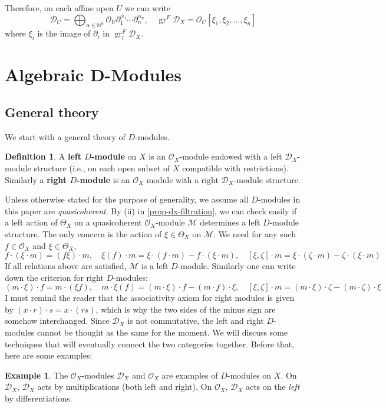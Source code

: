\documentclass[11pt, a4paper]{article}
\theoremstyle{definition}
\newtheorem{example}[theorem]{Example}
\newtheorem{definition}[theorem]{Definition}
\newcommand{\gr}{\operatorname{gr}}
\newcommand{\N}[0]{\mathbb{N}}
\begin{document}
    Therefore, on each affine open $U$ we can write
    \[\mathcal D_U=\bigoplus_{\alpha\in\N^n}\mathcal O_U\partial_1^{\alpha_1}\cdots\partial_n^{\alpha_n}, \quad \gr^F \mathcal D_X=\mathcal O_U[\xi_1,\xi_2,\dots,\xi_n]\]
    where $\xi_i$ is the image of $\partial_i$ in $\gr^F_l\mathcal D_X$.
    \section{Algebraic D-Modules}
    \subsection{General theory}
    We start with a general theory of $D$-modules.
    \begin{definition}
        A \textbf{left $D$-module} on $X$ is an $\mathcal O_X$-module endowed with a left $\mathcal D_X$-module structure (i.e., on each open subset of $X$ compatible with restrictions). Similarly a \textbf{right $D$-module} is an $\mathcal O_X$ module with a right $\mathcal D_X$-module structure.
    \end{definition}
    Unless otherwise stated for the purpose of generality, we assume all $D$-modules in this paper are \textit{quasicoherent}. By (ii) in \cref{prop-dx-filtration}, we can check easily if a left action of $\Theta_X$ on a quasicoherent $\mathcal O_X$-module $\mathcal M$ determines a left $D$-module structure. The only concern is the action of $\xi\in\Theta_X$ on $\mathcal M$. We need for any such $f\in\mathcal O_X$ and $\xi\in\Theta_X$,
    \[f\cdot(\xi\cdot m)=(f\xi)\cdot m,\quad \xi(f)\cdot m=\xi\cdot(f\cdot m)-f\cdot (\xi\cdot m),\quad [\xi,\zeta]\cdot m=\xi\cdot(\zeta\cdot m)-\zeta\cdot(\xi\cdot m)\]
    If all relations above are satisfied, $\mathcal M$ is a left $D$-module. Similarly one can write down the criterion for right $D$-modules:
    \[(m\cdot \xi)\cdot f=m\cdot(\xi f),\quad m\cdot\xi(f)=(m\cdot\xi)\cdot f-(m\cdot f)\cdot \xi,\quad [\xi, \zeta]\cdot m=(m\cdot\xi)\cdot\zeta-(m\cdot\zeta)\cdot\xi\] 
    I must remind the reader that the associativity axiom for right modules is given by $(x\cdot r)\cdot s=x\cdot (rs)$, which is why the two sides of the minus sign are somehow interchanged. Since $\mathcal D_X$ is not commutative, the left and right $D$-modules cannot be thought as the same for the moment. We will discuss some techniques that will eventually connect the two categories together. Before that, here are some examples:
    \begin{example}
        The $\mathcal O_X$-modules $\mathcal D_X$ and $\mathcal O_X$ are examples of $D$-modules on $X$. On $\mathcal D_X$, $\mathcal D_X$ acts by multiplications (both left and right). On $\mathcal O_X$, $\mathcal D_X$ acts on the \textit{left} by differentiations.
    \end{example}
\end{document}
